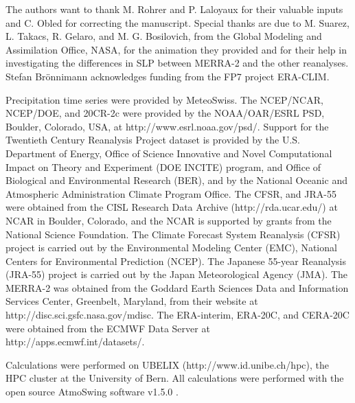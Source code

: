 \documentclass[smallextended]{svjour3}       %
\begin{document}
	\begin{acknowledgements}
	The authors want to thank M. Rohrer and P. Laloyaux for their valuable inputs and C. Obled for correcting the manuscript. Special thanks are due to M. Suarez, L. Takacs, R. Gelaro, and M. G. Bosilovich, from the Global Modeling and Assimilation Office, NASA, for the animation they provided and for their help in investigating the differences in SLP between MERRA-2 and the other reanalyses. Stefan Br\"{o}nnimann acknowledges funding from the FP7 project ERA-CLIM.
	
	Precipitation time series were provided by MeteoSwiss. The NCEP/NCAR, NCEP/DOE, and 20CR-2c were provided by the NOAA/OAR/ESRL PSD, Boulder, Colorado, USA, at http://www.esrl.noaa.gov/psd/. Support for the Twentieth Century Reanalysis Project dataset is provided by the U.S. Department of Energy, Office of Science Innovative and Novel Computational Impact on Theory and Experiment (DOE INCITE) program, and Office of Biological and Environmental Research (BER), and by the National Oceanic and Atmospheric Administration Climate Program Office. The CFSR, and JRA-55 were obtained from the CISL Research Data Archive (http://rda.ucar.edu/) at NCAR in Boulder, Colorado, and the NCAR is supported by grants from the National Science Foundation. The Climate Forecast System Reanalysis (CFSR) project is carried out by the Environmental Modeling Center (EMC), National Centers for Environmental Prediction (NCEP). The Japanese 55-year Reanalysis (JRA-55) project is carried out by the Japan Meteorological Agency (JMA). The MERRA-2 was obtained from the Goddard Earth Sciences Data and Information Services Center, Greenbelt, Maryland, from their website at http://disc.sci.gsfc.nasa.gov/mdisc. The ERA-interim, ERA-20C, and CERA-20C were obtained from the ECMWF Data Server at http://apps.ecmwf.int/datasets/. 
	
	Calculations were performed on UBELIX (http://www.id.unibe.ch/hpc), the HPC cluster at the University of Bern. All calculations were performed with the open source AtmoSwing software v1.5.0 \citep{Horton2017a}.
	\end{acknowledgements}
	
	
	
\end{document}
